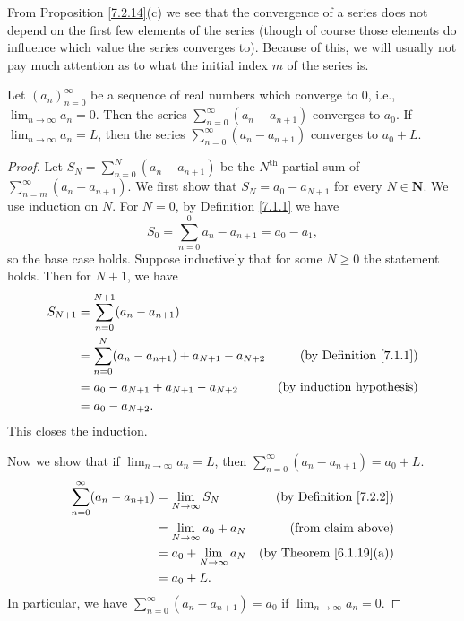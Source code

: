 \begin{note}
    From Proposition \ref{7.2.14}(c) we see that the convergence of a series does not depend on the first few elements of the series
    (though of course those elements do influence which value the series converges to).
    Because of this, we will usually not pay much attention as to what the initial index \(m\) of the series is.
\end{note}

\begin{lemma}\label{7.2.15}
    Let \((a_n)_{n = 0}^\infty\) be a sequence of real numbers which converge to \(0\), i.e., \(\lim_{n \to \infty} a_n = 0\).
    Then the series \(\sum_{n = 0}^\infty (a_n - a_{n + 1})\) converges to \(a_0\).
    If \(\lim_{n \to \infty} a_n = L\), then the series \(\sum_{n = 0}^\infty (a_n - a_{n + 1})\) converges to \(a_0 + L\).
\end{lemma}

\begin{proof}
    Let \(S_N = \sum_{n = 0}^N (a_n - a_{n + 1})\) be the \(N^{\text{th}}\) partial sum of \(\sum_{n = m}^\infty (a_n - a_{n + 1})\).
    We first show that \(S_N = a_0 - a_{N + 1}\) for every \(N \in \mathbf{N}\).
    We use induction on \(N\).
    For \(N = 0\), by Definition \ref{7.1.1} we have
    \[
        S_0 = \sum_{n = 0}^0 a_n - a_{n + 1} = a_0 - a_1,
    \]
    so the base case holds.
    Suppose inductively that for some \(N \geq 0\) the statement holds.
    Then for \(N + 1\), we have
    \begin{align*}
        S_{N + 1} & = \sum_{n = 0}^{N + 1} (a_n - a_{n + 1})                                                        \\
                  & = \sum_{n = 0}^N (a_n - a_{n + 1}) + a_{N + 1} - a_{N + 2} & \text{(by Definition \ref{7.1.1})} \\
                  & = a_0 - a_{N + 1} + a_{N + 1} - a_{N + 2}                  & \text{(by induction hypothesis)}   \\
                  & = a_0 - a_{N + 2}.
    \end{align*}
    This closes the induction.

    Now we show that if \(\lim_{n \to \infty} a_n = L\), then \(\sum_{n = 0}^\infty (a_n - a_{n + 1}) = a_0 + L\).
    \begin{align*}
        \sum_{n = 0}^\infty (a_n - a_{n + 1}) & = \lim_{N \to \infty} S_N       & \text{(by Definition \ref{7.2.2})}  \\
                                              & = \lim_{N \to \infty} a_0 + a_N & \text{(from claim above)}           \\
                                              & = a_0 + \lim_{N \to \infty} a_N & \text{(by Theorem \ref{6.1.19}(a))} \\
                                              & = a_0 + L.
    \end{align*}
    In particular, we have \(\sum_{n = 0}^\infty (a_n - a_{n + 1}) = a_0\) if \(\lim_{n \to \infty} a_n = 0\).
\end{proof}


